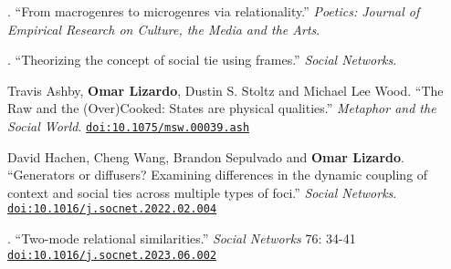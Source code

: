 

. ``From macrogenres to microgenres via relationality.'' {\em Poetics: Journal of Empirical Research on Culture, the Media and the Arts}.

. ``Theorizing the concept of social tie using frames.'' {\em Social Networks}.

\ind Travis Ashby, {\bf Omar Lizardo}, Dustin S. Stoltz and Michael Lee Wood. ``The Raw and the (Over)Cooked: States are physical qualities.'' {\em Metaphor and the Social World}. \href{https://doi.org/10.1075/msw.00039.ash}{\nolinkurl{doi:10.1075/msw.00039.ash}} 

\ind David Hachen, Cheng Wang, Brandon Sepulvado and {\bf Omar Lizardo}. ``Generators or diffusers? Examining differences in the dynamic coupling of context and social ties across multiple types of foci.'' {\em Social Networks}. \href{https://doi.org/10.1016/j.socnet.2022.02.004}{\nolinkurl{doi:10.1016/j.socnet.2022.02.004}}

. ``Two-mode relational similarities.'' {\em Social Networks}  76: 34-41 \href{https://doi.org/10.1016/j.socnet.2023.06.002}{\nolinkurl{doi:10.1016/j.socnet.2023.06.002}}

